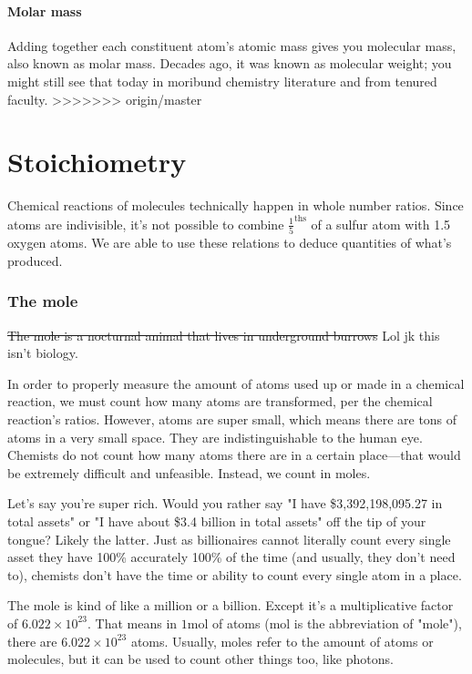 \documentclass[letterpaper, 12pt]{article}
\begin{document}
	\subsection{Molar mass}
	Adding together each constituent atom's atomic mass gives you molecular mass, also known as molar mass. Decades ago, it was known as molecular weight; you might still see that today in moribund chemistry literature and from tenured faculty.
>>>>>>> origin/master

\clearpage

\part{Stoichiometry}
Chemical reactions of molecules technically happen in whole number ratios. Since atoms are indivisible, it's not possible to combine $\frac{1}{5}^{\text{ths}}$ of a sulfur atom with 1.5 oxygen atoms. We are able to use these relations to deduce quantities of what's produced.

\section{The mole}
\st{The mole is a nocturnal animal that lives in underground burrows} Lol jk this isn't biology.

In order to properly measure the amount of atoms used up or made in a chemical reaction, we must count how many atoms are transformed, per the chemical reaction's ratios. However, atoms are super small, which means there are tons of atoms in a very small space. They are indistinguishable to the human eye. Chemists do not count how many atoms there are in a certain place---that would be extremely difficult and unfeasible. Instead, we count in moles.

Let's say you're super rich. Would you rather say "I have \$3,392,198,095.27 in total assets" or "I have about \$3.4 billion in total assets" off the tip of your tongue? Likely the latter. Just as billionaires cannot literally count every single asset they have 100\% accurately 100\% of the time (and usually, they don't need to), chemists don't have the time or ability to count every single atom in a place.

The mole is kind of like a million or a billion. Except it's a multiplicative factor of $6.022 \times 10^{23}$. That means in $1 \text{mol}$ of atoms (mol is the abbreviation of "mole"), there are $6.022 \times 10^{23}$ atoms. Usually, moles refer to the amount of atoms or molecules, but it can be used to count other things too, like photons.
\end{document}
